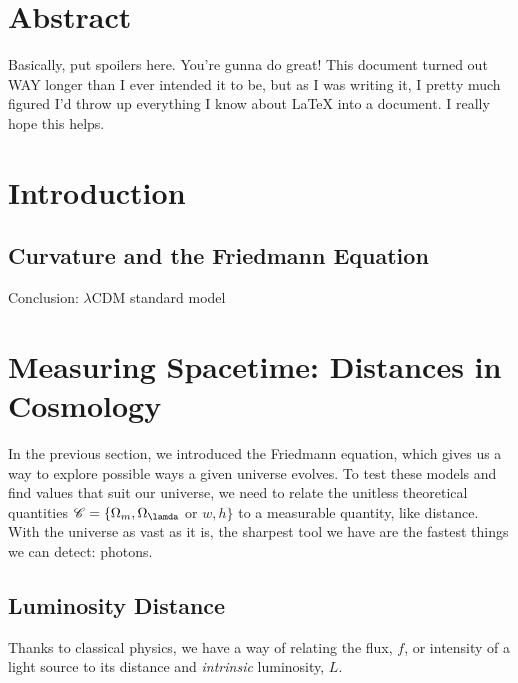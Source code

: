 \documentclass[12pt]{article}
\begin{document}
\newpage
{}
\vspace*{\fill}
\section*{Abstract}

Basically, put spoilers here. You're gunna do great! This document turned out WAY longer than I ever intended it to be, but as I was writing it, I pretty much figured I'd throw up everything I know about LaTeX into a document. I really hope this helps. 

\noindent 

\vspace*{\fill}

\newpage

\tableofcontents

\newpage
{}



\section{Introduction}

\subsection{Curvature and the Friedmann Equation}

Conclusion: $\lambda$CDM standard model

\section{Measuring Spacetime: Distances in Cosmology}
In the previous section, we introduced the Friedmann equation, which gives us a way to explore possible ways a given universe evolves. To test these models and find values that suit our universe, we need to relate the unitless theoretical quantities $\mathscr{C} = \{\Omega_m, \Omega_{\lamda}$ or $w, h\}$ to a measurable quantity, like distance. With the universe as vast as it is, the sharpest tool we have are the fastest things we can detect: photons.

\subsection{Luminosity Distance}
Thanks to classical physics, we have a way of relating the flux, $f$, or intensity of a light source to its distance and \textit{intrinsic} luminosity, $L$.
\end{document}
